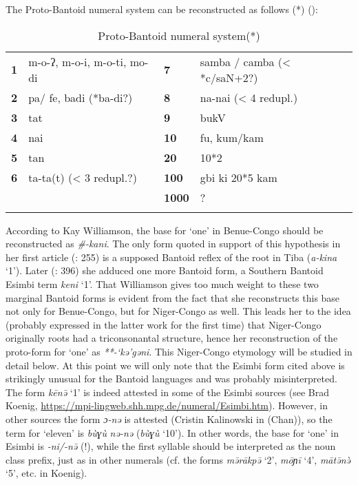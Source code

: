 The Proto-Bantoid numeral system can be reconstructed as follows (*) ():

\clearpage 
\begin{table}
\caption[Proto-Bantoid numeral system]{\label{tab:3:14}Proto-Bantoid numeral system(*)\footnotemark} 


\begin{tabularx}{\textwidth}{lXlX}
\lsptoprule

\textbf{1} & m-o-ʔ, m-o-i, m-o-ti, mo-di & \textbf{7} & samba / camba (< *c/saN+2?)\\
\textbf{2} & pa/ fe, badi (*ba-di?) & \textbf{8} & na-nai (< 4 redupl.)\\
\textbf{3} & tat & \textbf{9} & bukV\\
\textbf{4} & nai & \textbf{10} & fu, kum/kam\\
\textbf{5} & tan & \textbf{20} & 10*2\\
\textbf{6} & ta-ta(t) (< 3 redupl.?) & \textbf{100} & gbi\biberror{?} ki\biberror{?} 20*5\biberror{?} kam\biberror{?}\\
&  & \textbf{1000} & ?\\
\lspbottomrule
\end{tabularx}
\end{table}

According to Kay Williamson, the base for `one' in Benue-Congo should be reconstructed as \textit{\#-kani}. The only form quoted in support of this hypothesis in her first article (\citealt{Williamson1989b}: 255) is a supposed Bantoid reflex of the root in Tiba (\textit{a-kina} ‘1’). Later (\citealt{Williamson1992}: 396) she adduced one more Bantoid form, a Southern Bantoid Esimbi term \textit{keni} ‘1’. That Williamson gives too much weight to these two marginal Bantoid forms is evident from the fact that she reconstructs this base not only for Benue-Congo, but for Niger-Congo as well. This leads her to the idea (probably expressed in the latter work for the first time) that Niger-Congo originally roots had a triconsonantal structure, hence her reconstruction of the proto-form for ‘one’ as \textit{**-‘kə’gəni}. This Niger-Congo etymology will be studied in detail below. At this point we will only note that the Esimbi form cited above is strikingly unusual for the Bantoid languages and was probably misinterpreted. The form \textit{k{\={e}}n{\={ə}}} ‘1’ is indeed attested in some of the Esimbi sources (see Brad Koenig, \url{https://mpi-lingweb.shh.mpg.de/numeral/Esimbi.htm}). However, in other sources the form \textit{ɔ-nə} is attested (Cristin Kalinowski in (Chan)), so the term for ‘eleven’ is \textit{b{\`{u}}ɣ{\`{u}}} \textit{nə-nə} (\textit{b{\`{u}}ɣ{\`{u}}} ‘10’). In other words, the base for ‘one’ in Esimbi is \textit{-ni/-n{\={ə}}} (!), while the first syllable should be interpreted as the noun class prefix, just as in other numerals (cf. the forms \textit{m{\={ə}}r{\={a}}kp{\={ə}}} ‘2’, \textit{m{\={o}}ɲ{\={i}}} ‘4’, \textit{m{\={a}}t{\={ə}}n{\`{ə}}} ‘5’, etc. in Koenig). 


